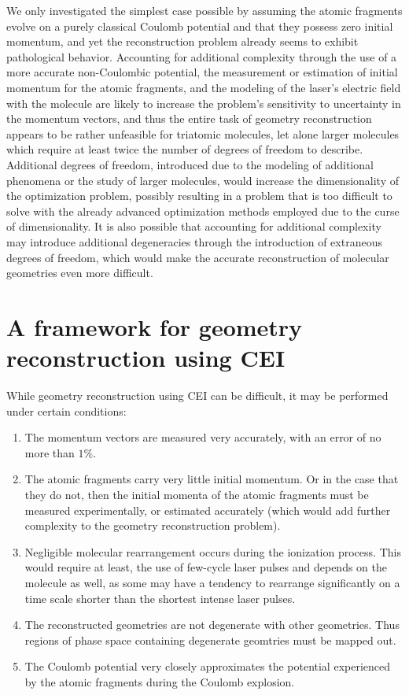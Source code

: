 We only investigated the simplest case possible by assuming the atomic fragments evolve on a purely classical Coulomb potential and that they possess zero initial momentum, and yet the reconstruction problem already seems to exhibit pathological behavior. Accounting for additional complexity through the use of a more accurate non-Coulombic potential, the measurement or estimation of initial momentum for the atomic fragments, and the modeling of the laser's electric field with the molecule are likely to increase the problem's sensitivity to uncertainty in the momentum vectors, and thus the entire task of geometry reconstruction appears to be rather unfeasible for triatomic molecules, let alone larger molecules which require at least twice the number of degrees of freedom to describe. Additional degrees of freedom, introduced due to the modeling of additional phenomena or the study of larger molecules, would increase the dimensionality of the optimization problem, possibly resulting in a problem that is too difficult to solve with the already advanced optimization methods employed due to the curse of dimensionality. It is also possible that accounting for additional complexity may introduce additional degeneracies through the introduction of extraneous degrees of freedom, which would make the accurate reconstruction of molecular geometries even more difficult.

\section{A framework for geometry reconstruction using CEI}
While geometry reconstruction using CEI can be difficult, it may be performed under certain conditions:
\begin{enumerate}
  \item The momentum vectors are measured very accurately, with an error of no more than $1\%$.
  \item The atomic fragments carry very little initial momentum. Or in the case that they do not, then the initial momenta of the atomic fragments must be measured experimentally, or estimated accurately (which would add further complexity to the geometry reconstruction problem).
  \item Negligible molecular rearrangement occurs during the ionization process. This would require at least, the use of few-cycle laser pulses and depends on the molecule as well, as some may have a tendency to rearrange significantly on a time scale shorter than the shortest intense laser pulses.
  \item The reconstructed geometries are not degenerate with other geometries. Thus regions of phase space containing degenerate geomtries must be mapped out.
  \item The Coulomb potential very closely approximates the potential experienced by the atomic fragments during the Coulomb explosion.
\end{enumerate}

